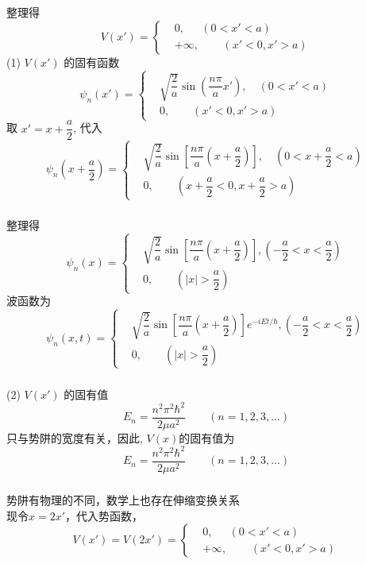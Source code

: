 \begin{frame} 
	整理得
	$$ \displaystyle 
	V(x')=\left\{ 
	\begin{aligned}
		&0, ~~\quad (0 < x' < a ) \\  
		&+\infty,~~\quad~~~ (x'< 0  , x' >a)
	\end{aligned}
	\right.$$
	(1)  $V(x')$ 的固有函数
\[ \psi_n(x')=\left\{
\begin{aligned}
	& \sqrt{\dfrac{2}{a}} \sin(\dfrac{n\pi}{a}x'), \quad (0 < x' < a) \\ 
	& 0, \quad \quad ( x' < 0, x' > a)
\end{aligned} \right.
\]
取 $x' = x + \dfrac{a}{2}$, 代入
\[ \psi_n(x + \dfrac{a}{2}) =\left\{
\begin{aligned}
	& \sqrt{\dfrac{2}{a}} \sin[\dfrac{n\pi}{a}(x + \dfrac{a}{2})], \quad (0 < x + \dfrac{a}{2} < a) \\ 
	& 0, \quad \quad ( x + \dfrac{a}{2} < 0, x + \dfrac{a}{2} > a)
\end{aligned} \right.
\]
\end{frame}

\begin{frame}
  \frametitle{}
  整理得
  \[ \psi_n(x) =\left\{
  \begin{aligned}
	& \sqrt{\dfrac{2}{a}} \sin[\dfrac{n\pi}{a}(x + \dfrac{a}{2})], (-\dfrac{a}{2} < x < \dfrac{a}{2} ) \\ 
	& 0, \quad \quad  (|x| > \dfrac{a}{2})
\end{aligned} \right.
\]
波函数为
\[ \psi_n(x,t) =\left\{
  \begin{aligned}
	& \sqrt{\dfrac{2}{a}} \sin[\dfrac{n\pi}{a}(x + \dfrac{a}{2})]e^{-iEt/\hbar}, (-\dfrac{a}{2} < x < \dfrac{a}{2} ) \\ 
	& 0, \quad \quad  (|x| > \dfrac{a}{2})
\end{aligned} \right.
\]
\end{frame}

\begin{frame}
  \frametitle{}
  (2) $V(x')$ 的固有值
  \[E_n = \dfrac{n^2\pi^2\hbar^2}{2\mu a^2} \qquad (n=1,2,3,...) \]
  只与势阱的宽度有关，因此, $V(x)$的固有值为
  \[E_n = \dfrac{n^2\pi^2\hbar^2}{2\mu a^2} \qquad (n=1,2,3,...) \]
\end{frame} 

\begin{frame}
  \frametitle{}
	\解 势阱有物理的不同，数学上也存在伸缩变换关系\\
	现令$x = 2x'$，代入势函数，
	$$ \displaystyle 
	V(x')=V(2x')=\left\{ 
	\begin{aligned}
		&0, ~~\quad (0 < x' < a)\\  
		&+\infty,~~\quad~~~ (x' < 0, x' > a)
	\end{aligned}
	\right.$$
\end{frame} 

